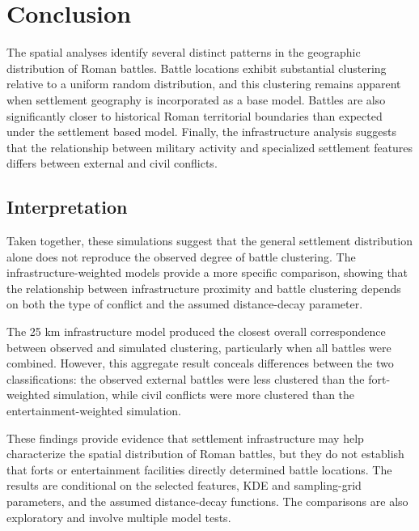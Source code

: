 \documentclass[
  letterpaper,
  DIV=11,
  numbers=noendperiod]{scrartcl}
\begin{document}
\section{Conclusion}\label{conclusion}

The spatial analyses identify several distinct patterns in the
geographic distribution of Roman battles. Battle locations exhibit
substantial clustering relative to a uniform random distribution, and
this clustering remains apparent when settlement geography is
incorporated as a base model. Battles are also significantly closer to
historical Roman territorial boundaries than expected under the
settlement based model. Finally, the infrastructure analysis suggests
that the relationship between military activity and specialized
settlement features differs between external and civil conflicts.

\subsection{Interpretation}\label{interpretation}

Taken together, these simulations suggest that the general settlement
distribution alone does not reproduce the observed degree of battle
clustering. The infrastructure-weighted models provide a more specific
comparison, showing that the relationship between infrastructure
proximity and battle clustering depends on both the type of conflict and
the assumed distance-decay parameter.

The 25 km infrastructure model produced the closest overall
correspondence between observed and simulated clustering, particularly
when all battles were combined. However, this aggregate result conceals
differences between the two classifications: the observed external
battles were less clustered than the fort-weighted simulation, while
civil conflicts were more clustered than the entertainment-weighted
simulation.

These findings provide evidence that settlement infrastructure may help
characterize the spatial distribution of Roman battles, but they do not
establish that forts or entertainment facilities directly determined
battle locations. The results are conditional on the selected features,
KDE and sampling-grid parameters, and the assumed distance-decay
functions. The comparisons are also exploratory and involve multiple
model tests.
\end{document}
